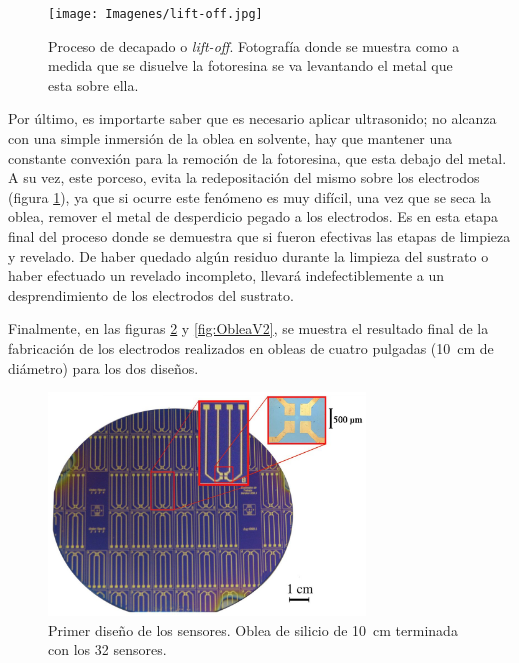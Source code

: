 					  \begin{figure}[ht!]
					  \begin{center}
					  \texttt{[image: Imagenes/lift-off.jpg]}
					  \caption[Proceso de decapado o\textit{ lift-off}]{Proceso de decapado o\textit{ lift-off}. Fotografía donde se muestra como a medida que se disuelve la fotoresina se va levantando el metal que esta sobre ella.}
					  \label{fig:ultrasonido}
					  \end{center}
					  \end{figure}

		 Por último, es importarte saber que es necesario aplicar ultrasonido; no alcanza con una simple inmersión de la oblea en solvente, hay que mantener una constante convexión para la remoción de la fotoresina, que esta debajo del metal. A su vez, este porceso, evita la redepositación del mismo sobre los electrodos (figura \ref{fig:ultrasonido}), ya que si ocurre este fenómeno es muy difícil, una vez que se seca la oblea, remover el metal de desperdicio pegado a los electrodos. Es en esta etapa final del proceso donde se demuestra que si fueron efectivas las etapas de limpieza y revelado. De haber quedado algún residuo durante la limpieza del sustrato o haber efectuado un revelado incompleto, llevará indefectiblemente a un desprendimiento de los electrodos del sustrato.

		 Finalmente, en las figuras \ref{fig:ObleaV1} y \ref{fig:ObleaV2}, se muestra el resultado final de la fabricación de los electrodos realizados en obleas de cuatro pulgadas (\SI{10}{\cm} de diámetro) para los dos diseños.

					  \begin{figure}[ht!]
					  \begin{center}
					  \includegraphics[width=0.75\textwidth]{Imagenes/ObleaV1.jpg}
					  \caption[Electrodos, primera versión]{Primer diseño de los sensores. Oblea de silicio de \SI{10}{cm} terminada con los 32 sensores.}
					  \label{fig:ObleaV1}
					  \end{center}
					  \end{figure} 	

